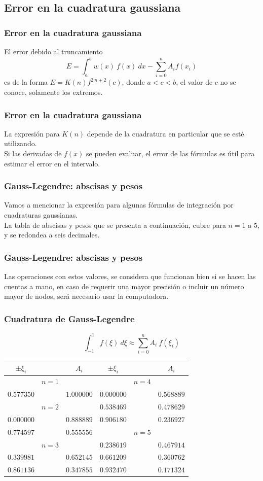\subsection{Error en la cuadratura gaussiana}
\begin{frame}
\frametitle{Error en la cuadratura gaussiana}
El error debido al truncamiento
\[ E = \int_{a}^{b} w(x) \: f(x) \: dx  - \sum_{i = 0}^{n} A_{i} f(x_{i})\]
es de la forma $E = K(n) f^{2 \: n + 2} (c) $, donde $a < c < b$, el valor de $c$ no se conoce, solamente los extremos.
\end{frame}
\begin{frame}
\frametitle{Error en la cuadratura gaussiana}
La expresión para $K(n)$ depende de la cuadratura en particular que se esté utilizando.
\\
\bigskip
Si las derivadas de $f(x)$ se pueden evaluar, el error de las fórmulas es útil para estimar el error en el intervalo.
\end{frame}
\begin{frame}
\frametitle{Gauss-Legendre: abscisas y pesos}
Vamos a mencionar la expresión para algunas fórmulas de integración por cuadraturas gaussianas.
\\
\bigskip
La tabla de abscisas y pesos que se presenta a continuación, cubre para $n=1$ a $5$, y se redondea a seis decimales.
\end{frame}
\begin{frame}
\frametitle{Gauss-Legendre: abscisas y pesos}
Las operaciones con estos valores, se considera que funcionan bien si se hacen las cuentas a mano, en caso de requerir una mayor precisión o incluir un número  mayor de nodos, será necesario usar la computadora.
\end{frame}
\begin{frame}[plain]
\frametitle{Cuadratura de Gauss-Legendre}
\[ \int_{-1}^{1} f(\xi) \: d \xi \approx \sum_{i = 0}^{n} A_{i} \: f(\xi_{i}) \]
\fontsize{10}{10}\selectfont
\begin{center}
\begin{tabular}{|c c c | c c c|}
\hline
$\pm \xi_{i}$ &       & $A_{i}$    & $\pm \xi_{i}$ &       & $A_{i}$ \\ \hline
             & $n = 1$ &            &               & $n = 4$ &         \\ %
$0.577350$    &       & $1.000000$ & $0.000000$    &       & $0.568889$ \\ %
             & $n = 2$ &            & $0.538469$    &       & $0.478629$ \\ %
$0.000000$    &       & $0.888889$ & $0.906180$    &       & $0.236927$ \\ %
$0.774597$    &       & $0.555556$ &               & $n = 5$ &            \\ %
             & $n = 3$ &            & $0.238619$    &       & $0.467914$ \\ %
$0.339981$    &       & $0.652145$ & $0.661209$    &       & $0.360762$ \\ %
$0.861136$    &       & $0.347855$ & $0.932470$    &       & $0.171324$ \\ \hline
\end{tabular}
\end{center}
\end{frame}

